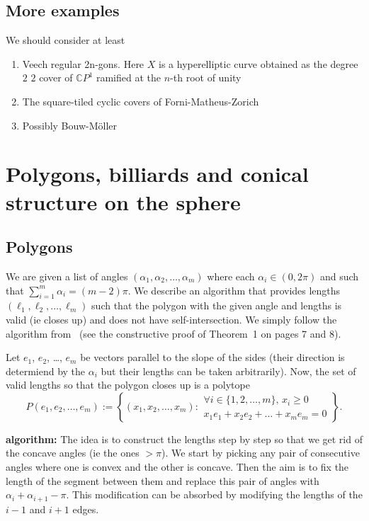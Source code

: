 \documentclass[a4paper,12pt]{article}
\def\bC{\mathbb{C}}
\begin{document}
\subsection{More examples}
We should consider at least
\begin{enumerate}
\item Veech regular 2n-gons. Here $X$ is a hyperelliptic curve obtained as the degree $2$
$2$ cover of $\bC P^1$ ramified at the $n$-th root of unity
\item The square-tiled cyclic covers of Forni-Matheus-Zorich \cite{ForniMatheusZorich:SquareTiled}
\item Possibly Bouw-M\"oller \cite{BouwMoeller}
\end{enumerate}



\section{Polygons, billiards and conical structure on the sphere}


\subsection{Polygons}
We are given a list of angles $(\alpha_1, \alpha_2, \ldots, \alpha_m)$ where each
$\alpha_i \in (0,2\pi)$ and such that $\sum_{i=1}^m \alpha_i = (m-2) \pi$. We describe
an algorithm that provides lengths $(\ell_1, \ell_2, \ldots, \ell_m)$ such that
the polygon with the given angle and lengths is valid (ie closes up) and does not have
self-intersection. We simply follow the algorithm from~\cite{EfratFulekKobourovToth} (see the constructive proof of Theorem~1 on pages 7 and 8).

Let $e_1$, $e_2$, \ldots, $e_m$ be vectors parallel to the slope of the sides
(their direction is determiend by the $\alpha_i$ but their lengths can be taken
arbitrarily). Now, the set of valid lengths so that the polygon closes up is a
polytope
\[
P(e_1, e_2, \ldots, e_m) := \left\{(x_1, x_2, \ldots, x_m):
\begin{array}{l}
\forall i \in \{1,2,\ldots,m\},\, x_i \geq 0 \\
x_1 e_1 + x_2 e_2 + \ldots + x_m e_m = 0
\end{array}
\right\}.
\]

\textbf{algorithm:}
The idea is to construct the lengths step by step so that we get rid of the concave angles
(ie the ones $> \pi$). We start by picking any pair of consecutive angles where one is
convex and the other is concave. Then the aim is to fix the length of the segment between
them and replace this pair of angles with $\alpha_i + \alpha_{i+1} - \pi$. This modification can be absorbed by modifying the lengths of the $i-1$ and $i+1$ edges.
\end{document}
